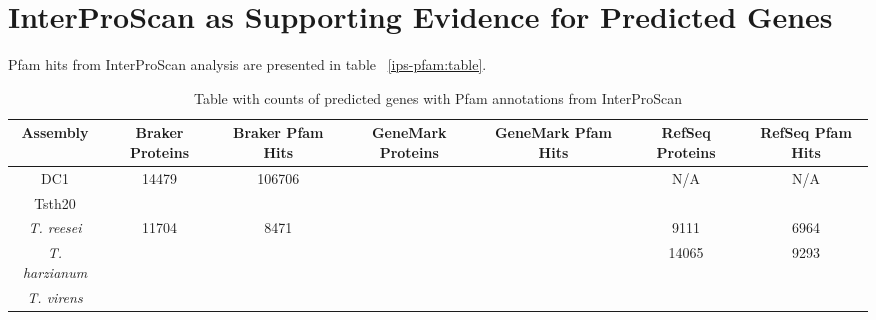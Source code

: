 \section{InterProScan as Supporting Evidence for Predicted Genes}

Pfam hits from InterProScan analysis are presented in table
~\ref{ips-pfam:table}.

\begin{center}
  \begin{table}
    \begin{tabular}{|c|c|c|c|c|c|c|}
      \hline
      Assembly & Braker Proteins & Braker Pfam Hits & GeneMark Proteins & GeneMark Pfam Hits & RefSeq Proteins & RefSeq Pfam Hits  \\ \hline
      DC1 & 14479 & 106706 &   &   & N/A & N/A \\ \hline
      Tsth20 &  &  &  &  &  &  \\ \hline
      \textit{T. reesei} & 11704 & 8471 &  &  & 9111 & 6964 \\ \hline
      \textit{T. harzianum} &  &  &  &  & 14065 & 9293 \\ \hline
      \textit{T. virens} &  &  &  &  & &  \\ \hline
    \end{tabular}
    \caption[InterProScan Pfam Evidence]{Table with counts of predicted genes with Pfam annotations from InterProScan}
    \label{table:regioncounts}
  \end{table}
\end{center}
